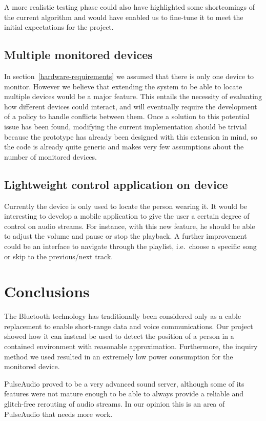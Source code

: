 \documentclass[conference]{IEEEtran}
\begin{document}
A more realistic testing phase could also have highlighted some shortcomings of the current algorithm and would have enabled us to fine-tune it to meet the initial expectations for the project.

\subsection{Multiple monitored devices}
In section~\ref{hardware-requirements} we assumed that there is only one device to monitor. However we believe that extending the system to be able to locate multiple devices would be a major feature. This entails the necessity of evaluating how different devices could interact, and will eventually require the development of a policy to handle conflicts between them. Once a solution to this potential issue has been found, modifying the current implementation should be trivial because the prototype has already been designed with this extension in mind, so the code is already quite generic and makes very few assumptions about the number of monitored devices.

\subsection{Lightweight control application on device}
Currently the device is only used to locate the person wearing it. It would be interesting to develop a mobile application to give the user a certain degree of control on audio streams. For instance, with this new feature, he should be able to adjust the volume and pause or stop the playback. A further improvement could be an interface to navigate through the playlist, i.e.\ choose a specific song or skip to the previous/next track.


\vspace{4mm}
\section{Conclusions}
The Bluetooth technology has traditionally been considered only as a cable replacement to enable short-range data and voice communications. Our project showed how it can instead be used to detect the position of a person in a contained environment with reasonable approximation. Furthermore, the inquiry method we used resulted in an extremely low power consumption for the monitored device.

PulseAudio proved to be a very advanced sound server, although some of its features were not mature enough to be able to always provide a reliable and glitch-free rerouting of audio streams. In our opinion this is an area of PulseAudio that needs more work.
\end{document}
